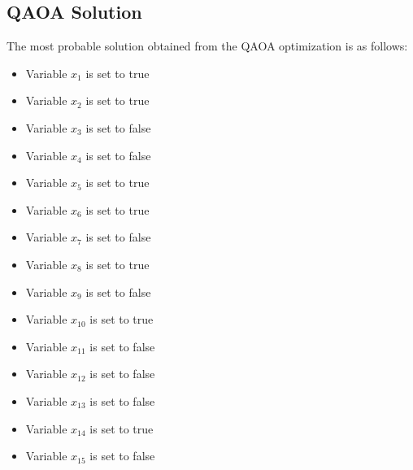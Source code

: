 \documentclass{article}%
\begin{document}
%
\subsection{QAOA Solution}%
\label{subsec:QAOASolution}%
The most probable solution obtained from the QAOA optimization is as follows:\newline%
%
\begin{itemize}%
\item Variable \( x_1 \) is set to true%
\item Variable \( x_2 \) is set to true%
\item Variable \( x_3 \) is set to false%
\item Variable \( x_4 \) is set to false%
\item Variable \( x_5 \) is set to true%
\item Variable \( x_6 \) is set to true%
\item Variable \( x_7 \) is set to false%
\item Variable \( x_8 \) is set to true%
\item Variable \( x_9 \) is set to false%
\item Variable \( x_10 \) is set to true%
\item Variable \( x_11 \) is set to false%
\item Variable \( x_12 \) is set to false%
\item Variable \( x_13 \) is set to false%
\item Variable \( x_14 \) is set to true%
\item Variable \( x_15 \) is set to false%
\end{itemize}

%
\end{document}

